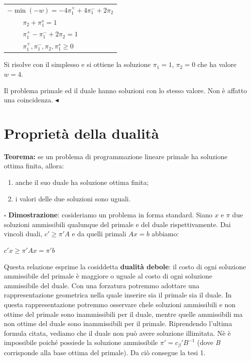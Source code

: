 \documentclass[11pt]{book}
\begin{document}
\vspace{11pt}
\begin{center}
\begin{tabular}{l}
$-\min (-w) = -4\pi_1^+ + 4\pi_1^- + 2\pi_2$\\
$\phantom{min z}\pi_2 + \pi_1^s =1$\\
$\phantom{min z}\pi_1^+ - \pi_1^- + 2\pi_2 = 1$\\
$\phantom{min z}\pi_1^+, \pi_1^-, \pi_2, \pi_1^s \geq 0$\\
\end{tabular}
\end{center}
\vspace{11pt}

Si risolve con il simplesso e si ottiene la soluzione $\pi_1 = 1$,
$\pi_2 = 0$ che ha valore $w = 4$. 

Il problema primale ed il duale hanno soluzioni con lo stesso
valore. Non \`e affatto una coincidenza. $\blacktriangleleft$
\vspace{11pt}

\section{Propriet\`a della dualit\`a}

{\bf Teorema:} se un problema di programmazione lineare primale ha
soluzione ottima finita, allora:

\begin{enumerate}
\item anche il suo duale ha soluzione ottima finita;
\item i valori delle due soluzioni sono uguali.
\end{enumerate}

\vspace{11pt}
$\square$ {\bf Dimostrazione}: cosideriamo un problema in forma
standard. Siano $x$ e $\pi$ due soluzioni ammissibili qualunque del
primale e del duale rispettivamente. Dai vincoli duali, $c' \geq
\pi'A$ e da quelli primali $Ax=b$ abbiamo:

\begin{center}
$c'x \geq \pi'Ax = \pi'b$  
\end{center}

Questa relazione esprime la cosiddetta {\bf dualit\`a debole}: il
costo di ogni soluzione ammissibile del primale \`e maggiore o uguale
al costo di ogni soluzione ammissibile del duale. Con una forzatura
potremmo adottare una rappresentazione geometrica nella quale inserire
sia il primale sia il duale. In questa rappresentazione potremmo
osservare chele soluzioni ammissibili e non ottime del primale sono
inammissibili per il duale, mentre quelle ammissibili ma non ottime
del duale sono inammissibili per il primale. Riprendendo l'ultima
formula citata, vediamo che il duale non pu\`o avere soluzione
illimitata. N\`e \`e impossibile poich\'e possiede la soluzione
ammissibile $\pi' = c_\beta'B^{-1}$ (dove {\em B} corrisponde alla
base ottima del primale). Da ci\`o consegue la tesi 1.
\end{document}

